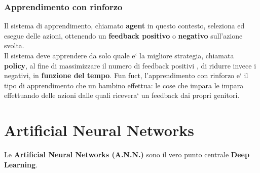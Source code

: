 \subsubsection{Apprendimento con rinforzo}
{
    Il sistema di apprendimento, chiamato \textbf{agent} in questo contesto, 
%
    seleziona ed esegue delle azioni, ottenendo un \textbf{feedback positivo}  o \textbf{negativo} 
%
    sull'azione svolta.
\\
    Il sistema deve apprendere da solo quale e` la migliore strategia, chiamata 
%
    \textbf{policy}, al fine di massimizzare il numero di feedback positivi
%
    , di ridurre invece i negativi, in \textbf{funzione del tempo}.
}
Fun fuct, l'apprendimento con rinforzo e` il tipo di apprendimento che un 
%
bambino effettua: le cose che impara le impara effettuando delle azioni dalle 
%
quali ricevera` un feedback dai propri genitori.
\newpage
\section{Artificial Neural Networks}
Le \textbf{Artificial Neural Networks (A.N.N.)} sono il vero punto centrale 
%
\textbf{Deep Learning}.
